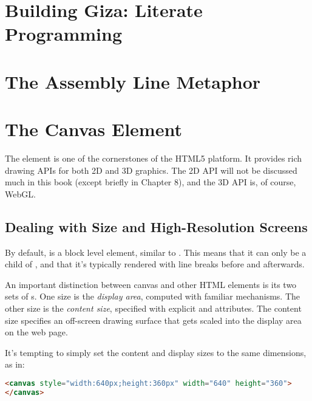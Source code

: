 \section{Building Giza: Literate Programming}

\section{The Assembly Line Metaphor}

\section{The Canvas Element}

The  element is one of the cornerstones of the HTML5 platform.  It provides rich drawing APIs for both 2D and 3D graphics.  The 2D API will not be discussed much in this book (except briefly in Chapter 8), and the 3D API is, of course, WebGL.

\subsection{Dealing with Size and High-Resolution Screens}

By default,  is a block level element, similar to .  This means that it can only be a child of , and that it's typically rendered with line breaks before and afterwards.

An important distinction between canvas and other HTML elements is its two sets of s.  One size is the \emph{display area}, computed with familiar  mechanisms.  The other size is the \emph{content size}, specified with explicit  and  attributes.  The content size specifies an off-screen drawing surface that gets scaled into the display area on the web page.

It's tempting to simply set the content and display sizes to the same dimensions, as in:

\begin{lstlisting}[language=HTML]
<canvas style="width:640px;height:360px" width="640" height="360">
</canvas>
\end{lstlisting}

